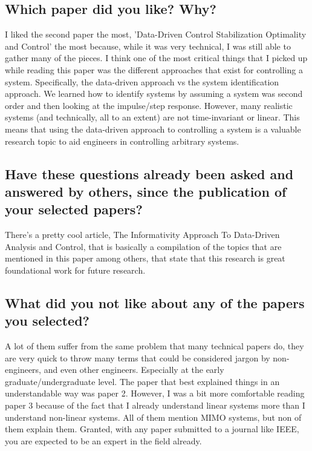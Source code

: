 \documentclass{IEEEtran}
\begin{document}
\subsection{Which paper did you like? Why?}

I liked the second paper the most, 'Data-Driven Control Stabilization Optimality and Control' the most because, while it was very technical, I was still able to gather many of the pieces. I think one of the most critical things that I picked up while reading this paper was the different approaches that exist for controlling a system. Specifically, the data-driven approach vs the system identification approach. We learned how to identify systems by assuming a system was second order and then looking at the impulse/step response. However, many realistic systems (and technically, all to an extent) are not time-invariant or linear. This means that using the data-driven approach to controlling a system is a valuable research topic to aid engineers in controlling arbitrary systems.

\subsection{Have these questions already been asked and answered by others, since the publication of your selected papers?}

There's a pretty cool article, The Informativity Approach To Data-Driven Analysis and Control\cite{vanwaarde2023informativity}, that is basically a compilation of the topics that are mentioned in this paper among others, that state that this research is great foundational work for future research.


\subsection{What did you not like about any of the papers you selected?}

A lot of them suffer from the same problem that many technical papers do, they are very quick to throw many terms that could be considered jargon by non-engineers, and even other engineers. Especially at the early graduate/undergraduate level. The paper that best explained things in an understandable way was paper 2. However, I was a bit more comfortable reading paper 3 because of the fact that I already understand linear systems more than I understand non-linear systems. All of them mention MIMO systems, but non of them explain them. Granted, with any paper submitted to a journal like IEEE, you are expected to be an expert in the field already.
\end{document}
